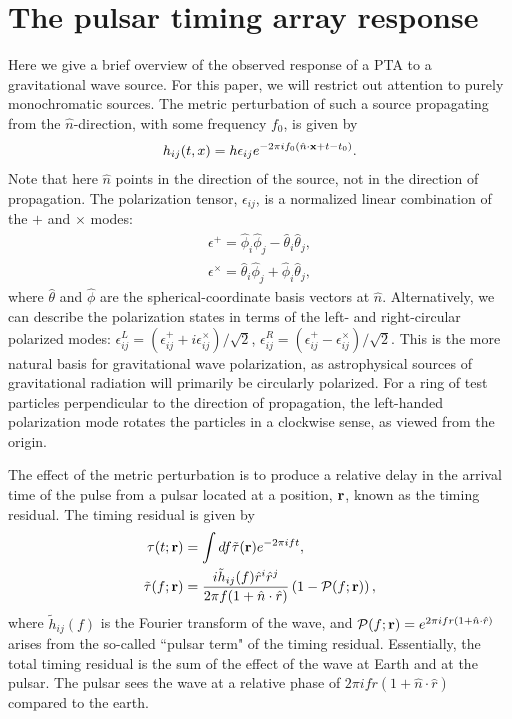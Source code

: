 \documentclass[%
 reprint,
nofootinbib,
 amsmath,amssymb,
 aps,
]{revtex4-2}
\begin{document}
\section{\label{sec:observables}The pulsar timing array response}

Here we give a brief overview of the observed response of a PTA to a gravitational wave source. For this paper, we will restrict out attention to purely monochromatic sources. The metric perturbation of such a source propagating from the $\hat{n}$-direction, with some frequency $f_0$, is given by
\begin{align}
    h_{ij}(t, x) = h \epsilon_{ij} e^{-2 \pi i f_0 (\hat{n} \cdot {\bf x} + t - t_0)}.
\end{align}
Note that here $\hat{n}$ points in the direction of the source, not in the direction of propagation. The polarization tensor, $\epsilon_{ij}$, is a normalized linear combination of the $+$ and $\times$ modes:
\begin{align}
    \epsilon^+ = \hat{\phi}_i \hat{\phi}_j - \hat{\theta}_i \hat{\theta}_j, \\
    \epsilon^\times = \hat{\theta}_i \hat{\phi}_j + \hat{\phi}_i \hat{\theta}_j,
\end{align}
where $\hat{\theta}$ and $\hat{\phi}$ are the spherical-coordinate basis vectors at $\hat{n}$. Alternatively, we can describe the polarization states in terms of the left- and right-circular polarized modes: $\epsilon^L_{ij} = (\epsilon^+_{ij} + i \epsilon^\times_{ij}) / \sqrt{2}$, $ \epsilon^R_{ij} = (\epsilon^+_{ij} - \epsilon^\times_{ij}) / \sqrt{2}$. This is the more natural basis for gravitational wave polarization, as astrophysical sources of gravitational radiation will primarily be circularly polarized. For a ring of test particles perpendicular to the direction of propagation, the left-handed polarization mode rotates the particles in a clockwise sense, as viewed from the origin. 

The effect of the metric perturbation is to produce a relative delay in the arrival time of the pulse from a pulsar located at a position, ${\bf r}$, known as the timing residual. The timing residual is given by \citep{Maiorano2021}
\begin{align}
    \tau(t; {\bf r}) &= \int df \tilde{\tau}({\bf r}) e^{-2 \pi i f t}, \\
    \tilde{\tau}(f; {\bf r}) &= \frac{i \tilde{h}_{ij}(f) \hat{r}^i \hat{r}^j}{2 \pi f (1 + \hat{n} \cdot \hat{r})} \left( 1 - \mathcal{P}(f; \bf{r})\right),
\end{align}
where $\tilde{h}_{ij}(f)$ is the Fourier transform of the wave, and $\mathcal{P}(f; {\bf r}) = e^{2 \pi i f r (1 + \hat{n} \cdot \hat{r})}$ arises from the so-called ``pulsar term" of the timing residual. Essentially, the total timing residual is the sum of the effect of the wave at Earth and at the pulsar. The pulsar sees the wave at a relative phase of $2 \pi i f r (1 + \hat{n} \cdot \hat{r})$ compared to the earth. 
\end{document}
